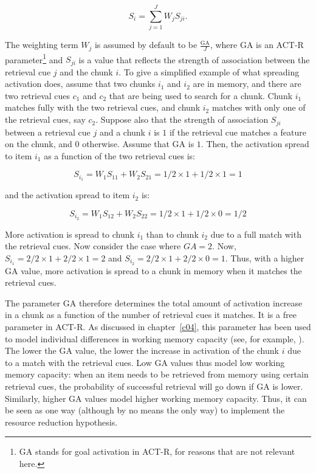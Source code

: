 \documentclass{cambridge7A}\usepackage[]{graphicx}\usepackage[]{color}
\begin{document}
\begin{equation}\label{eq:2}
  S_i = \sum_{j=1}^J W_j S_{ji}.
\end{equation}

\noindent
The weighting term $W_j$ is assumed by default to be $\frac{\text{GA}}{J}$, where GA is an ACT-R parameter\footnote{GA stands for goal activation in ACT-R, for reasons that are not relevant here.} and $S_{ji}$ is a value that  reflects the strength of association between  the retrieval cue $j$ and the chunk $i$. To give a simplified  example of what spreading activation does, assume that two chunks $i_1$ and $i_2$ are in memory, and there are two retrieval cues $c_1$ and $c_2$ that are being used to search for a chunk. Chunk $i_1$ matches fully with the two retrieval cues, and chunk $i_2$ matches with only one of the retrieval cues, say $c_2$.  Suppose also that the strength of association $S_{ji}$ between a retrieval cue $j$ and a chunk $i$ is $1$ if the retrieval cue matches a feature on the chunk, and $0$ otherwise. Assume that GA is $1$.
Then, the activation spread to item $i_1$ as a function of the two retrieval cues is: 

\begin{equation}
  S_{i_1} = W_1 S_{11}+W_2 S_{21}=1/2 \times 1 + 1/2 \times 1 = 1
\end{equation}

and the activation spread to item $i_2$ is:

\begin{equation}
  S_{i_2} = W_1 S_{12}+W_2 S_{22}=1/2 \times 1 + 1/2 \times 0 = 1/2
\end{equation}

More activation is spread to chunk $i_1$ than to chunk $i_2$ due to a full match with the retrieval cues. Now consider the case where $GA=2$. Now, 
$S_{i_1}= 2/2 \times 1 + 2/2 \times 1 = 2$ and 
$S_{i_2}= 2/2 \times 1 + 2/2 \times 0 = 1$. Thus, with a higher GA value, more activation is spread to a chunk in memory when it matches the retrieval cues.

The parameter GA therefore determines the total amount of activation increase in a chunk as a function of the number of retrieval cues it matches. It is a free parameter in ACT-R. As discussed in chapter~\ref{c04}, this parameter 
has been used to model individual differences in working memory capacity (see, for example, \cite{DailyEtAl2001}). 
The lower the GA value, the lower the increase in activation of the chunk $i$ due to a match with the retrieval cues.
Low GA values thus model low working memory capacity: when an item needs to be retrieved from memory using certain retrieval cues, the probability of successful retrieval will go down if GA is lower.
Similarly, higher GA values model higher working memory capacity.
Thus, it can be seen as one way (although by no means the only way) to implement the resource reduction hypothesis. 
\end{document}
